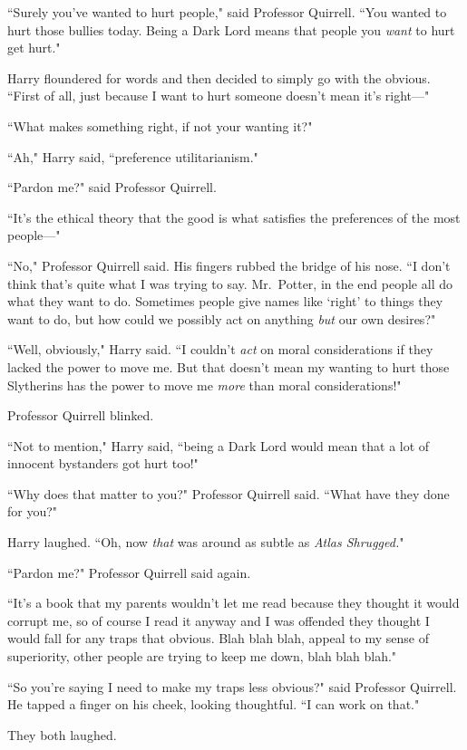 ``Surely you've wanted to hurt people," said Professor Quirrell. ``You wanted to hurt those bullies today. Being a Dark Lord means that people you \emph{want} to hurt get hurt."

Harry floundered for words and then decided to simply go with the obvious. ``First of all, just because I want to hurt someone doesn't mean it's right—"

``What makes something right, if not your wanting it?"

``Ah," Harry said, ``preference utilitarianism."

``Pardon me?" said Professor Quirrell.

``It's the ethical theory that the good is what satisfies the preferences of the most people—"

``No," Professor Quirrell said. His fingers rubbed the bridge of his nose. ``I don't think that's quite what I was trying to say. Mr.~Potter, in the end people all do what they want to do. Sometimes people give names like `right' to things they want to do, but how could we possibly act on anything \emph{but} our own desires?"

``Well, obviously," Harry said. ``I couldn't \emph{act} on moral considerations if they lacked the power to move me. But that doesn't mean my wanting to hurt those Slytherins has the power to move me \emph{more} than moral considerations!"

Professor Quirrell blinked.

``Not to mention," Harry said, ``being a Dark Lord would mean that a lot of innocent bystanders got hurt too!"

``Why does that matter to you?" Professor Quirrell said. ``What have they done for you?"

Harry laughed. ``Oh, now \emph{that} was around as subtle as \emph{Atlas Shrugged.}"

``Pardon me?" Professor Quirrell said again.

``It's a book that my parents wouldn't let me read because they thought it would corrupt me, so of course I read it anyway and I was offended they thought I would fall for any traps that obvious. Blah blah blah, appeal to my sense of superiority, other people are trying to keep me down, blah blah blah."

``So you're saying I need to make my traps less obvious?" said Professor Quirrell. He tapped a finger on his cheek, looking thoughtful. ``I can work on that."

They both laughed.

